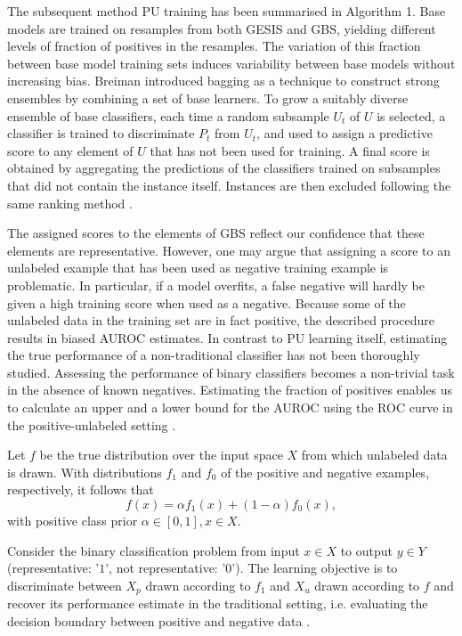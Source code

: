\newpage
The subsequent method PU training has been summarised in Algorithm 1. Base models are trained on resamples from both GESIS and GBS, yielding different levels of fraction of positives in the resamples. The variation of this fraction between base model training sets induces variability between base models without increasing bias. Breiman \cite{leo} introduced bagging as a technique to construct strong ensembles by combining a set of base learners. To grow a suitably diverse ensemble of base classifiers, each time a random subsample \(U_t\) of \(U\) is selected, a classiﬁer is trained to discriminate \(P_t\) from \(U_t\), and used to assign a predictive score to any element of \(U\) that has not been used for training. A final score is obtained by aggregating the predictions of the classifiers trained on subsamples that did not contain the instance itself. Instances are then excluded following the same ranking method \cite{claesen2, jain2}.

The assigned scores to the elements of GBS reflect our confidence that these elements are representative. However, one may argue that assigning a score to an unlabeled example that has been used as negative training example is problematic. In particular, if a model overfits, a false negative will hardly be given a high training score when used as a negative. Because some of the unlabeled data in the training set are in fact positive, the described procedure results in biased AUROC estimates. In contrast to PU learning itself, estimating the true performance of a non-traditional classifier has not been thoroughly studied. Assessing the performance of binary classifiers becomes a non-trivial task in the absence of known negatives. Estimating the fraction of positives enables us to calculate an upper and a lower bound for the AUROC using the ROC curve in the positive-unlabeled setting \cite{claesen2, jain, jain2}.

Let \(f\) be the true distribution over the input space \(X\) from which unlabeled data is drawn. With distributions \(f_1\) and \(f_0\) of the positive and negative examples, respectively, it follows that \[f(x) = \alpha f_1(x) + (1-\alpha)f_0(x),\] with positive class prior \(\alpha \in [0,1], x \in X\).

Consider the binary classification problem from input \(x \in X\) to output \(y \in Y\) (representative: '\(1\)', not representative: '\(0\)'). The learning objective is to discriminate between \(X_p\) drawn according to \(f_1\) and \(X_u\) drawn according to \(f\)  and recover its performance estimate in the traditional setting, i.e. evaluating the decision boundary between positive and negative data \cite{jain}.

